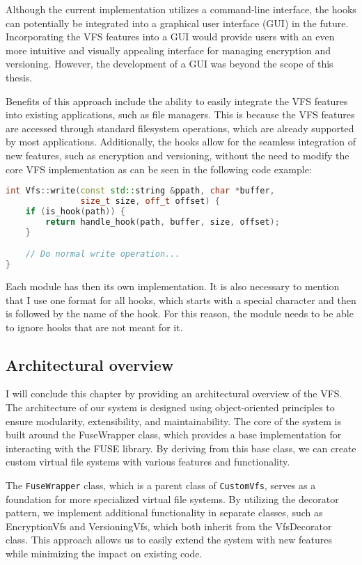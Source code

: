 Although the current implementation utilizes a command-line interface, the hooks can potentially be integrated into a graphical user interface (GUI) in the future.
Incorporating the VFS features into a GUI would provide users with an even more intuitive and visually appealing interface for managing encryption and versioning.
However, the development of a GUI was beyond the scope of this thesis.

Benefits of this approach include the ability to easily integrate the VFS features into existing applications, such as file managers.
This is because the VFS features are accessed through standard filesystem operations, which are already supported by most applications.
Additionally, the hooks allow for the seamless integration of new features, such as encryption and versioning, without the need to modify the core VFS implementation as can be seen in the following code example:

\begin{lstlisting}[language=c++, caption={Example of hook implementation}, basicstyle=\ttfamily\small]
int Vfs::write(const std::string &ppath, char *buffer,
               size_t size, off_t offset) {
    if (is_hook(path)) {
        return handle_hook(path, buffer, size, offset);
    }

    // Do normal write operation...
}
\end{lstlisting}

Each module has then its own implementation.
It is also necessary to mention that I use one format for all hooks, which starts with a special character and then is followed by the name of the hook.
For this reason, the module needs to be able to ignore hooks that are not meant for it.

\subsection{Architectural overview}\label{subsec:overview}

I will conclude this chapter by providing an architectural overview of the VFS.
The architecture of our system is designed using object-oriented principles to ensure modularity, extensibility, and maintainability.
The core of the system is built around the FuseWrapper class, which provides a base implementation for interacting with the FUSE library.
By deriving from this base class, we can create custom virtual file systems with various features and functionality.

The \texttt{FuseWrapper} class, which is a parent class of \texttt{CustomVfs}, serves as a foundation for more specialized virtual file systems.
By utilizing the decorator pattern, we implement additional functionality in separate classes, such as EncryptionVfs and VersioningVfs, which both inherit from the VfsDecorator class.
This approach allows us to easily extend the system with new features while minimizing the impact on existing code.

